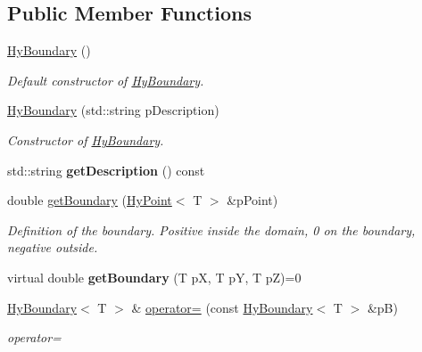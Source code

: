 \subsection*{Public Member Functions}
\begin{DoxyCompactItemize}
\item 
\hypertarget{classHyBoundary_aa8cbd9afcca0c5190d485da790a35cb5}{
\hyperlink{classHyBoundary_aa8cbd9afcca0c5190d485da790a35cb5}{HyBoundary} ()}
\label{classHyBoundary_aa8cbd9afcca0c5190d485da790a35cb5}

\begin{DoxyCompactList}\small\item\em Default constructor of \hyperlink{classHyBoundary}{HyBoundary}. \item\end{DoxyCompactList}\item 
\hyperlink{classHyBoundary_a7d47a3c2a01860fa91c754e049e620d5}{HyBoundary} (std::string pDescription)
\begin{DoxyCompactList}\small\item\em Constructor of \hyperlink{classHyBoundary}{HyBoundary}. \item\end{DoxyCompactList}\item 
\hypertarget{classHyBoundary_ad57ad019c8982491f5bcd8270c05d8fc}{
std::string {\bfseries getDescription} () const }
\label{classHyBoundary_ad57ad019c8982491f5bcd8270c05d8fc}

\item 
double \hyperlink{classHyBoundary_a138c96a97075dc41eead25963c1bf785}{getBoundary} (\hyperlink{classHyPoint}{HyPoint}$<$ T $>$ \&pPoint)
\begin{DoxyCompactList}\small\item\em Definition of the boundary. Positive inside the domain, 0 on the boundary, negative outside. \item\end{DoxyCompactList}\item 
\hypertarget{classHyBoundary_aab7edbacd9ab3194cd1704132b040298}{
virtual double {\bfseries getBoundary} (T pX, T pY, T pZ)=0}
\label{classHyBoundary_aab7edbacd9ab3194cd1704132b040298}

\item 
\hyperlink{classHyBoundary}{HyBoundary}$<$ T $>$ \& \hyperlink{classHyBoundary_a0e9c5e3a7b5c161bd47e98ca0e265fc5}{operator=} (const \hyperlink{classHyBoundary}{HyBoundary}$<$ T $>$ \&pB)
\begin{DoxyCompactList}\small\item\em operator= \item\end{DoxyCompactList}\end{DoxyCompactItemize}

